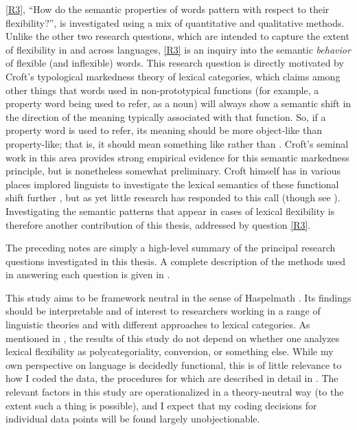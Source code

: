\ref{R3}, \enquote{How do the semantic properties of words pattern with respect to their flexibility?}, is investigated using a mix of quantitative and qualitative methods. Unlike the other two research questions, which are intended to capture the extent of flexibility in and across languages, \ref{R3} is an inquiry into the semantic \emph{behavior} of flexible (and inflexible) words. This research question is directly motivated by Croft's  typological markedness theory of lexical categories, which claims among other things that words used in non-prototypical functions (for example, a property word being used to refer, as a noun) will always show a semantic shift in the direction of the meaning typically associated with that function. So, if a property word is used to refer, its meaning should be more object-like than property-like; that is, it should mean something like  rather than . Croft's  seminal work in this area provides strong empirical evidence for this semantic markedness principle, but is nonetheless somewhat preliminary. Croft himself has in various places implored linguists to investigate the lexical semantics of these functional shift further , but as yet little research has responded to this call (though see ). Investigating the semantic patterns that appear in cases of lexical flexibility is therefore another contribution of this thesis, addressed by question \ref{R3}.

The preceding notes are simply a high-level summary of the principal research questions investigated in this thesis. A complete description of the methods used in answering each question is given in .

This study aims to be framework neutral in the sense of Haspelmath . Its findings should be interpretable and of interest to researchers working in a range of linguistic theories and with different approaches to lexical categories. As mentioned in , the results of this study do not depend on whether one analyzes lexical flexibility as polycategoriality, conversion, or something else. While my own perspective on language is decidedly functional, this is of little relevance to how I coded the data, the procedures for which are described in detail in . The relevant factors in this study are operationalized in a theory-neutral way (to the extent such a thing is possible), and I expect that my coding decisions for individual data points will be found largely unobjectionable.

